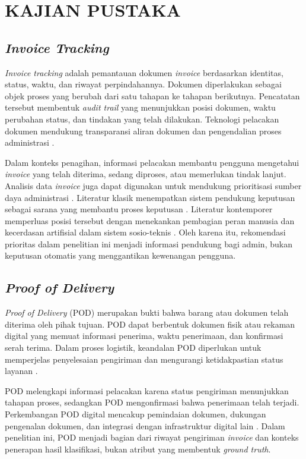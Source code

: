 \chapter{KAJIAN PUSTAKA}

\section{\textit{Invoice Tracking}}

\textit{Invoice tracking} adalah pemantauan dokumen \textit{invoice} berdasarkan identitas, status, waktu, dan riwayat perpindahannya. Dokumen diperlakukan sebagai objek proses yang berubah dari satu tahapan ke tahapan berikutnya. Pencatatan tersebut membentuk \textit{audit trail} yang menunjukkan posisi dokumen, waktu perubahan status, dan tindakan yang telah dilakukan. Teknologi pelacakan dokumen mendukung transparansi aliran dokumen dan pengendalian proses administrasi \cite{10.1007/978-3-642-55032-4_33}.

Dalam konteks penagihan, informasi pelacakan membantu pengguna mengetahui \textit{invoice} yang telah diterima, sedang diproses, atau memerlukan tindak lanjut. Analisis data \textit{invoice} juga dapat digunakan untuk mendukung prioritisasi sumber daya administrasi \cite{SchoonbeeEtAl2022}. Literatur klasik menempatkan sistem pendukung keputusan sebagai sarana yang membantu proses keputusan \cite{ShimEtAl2002}. Literatur kontemporer memperluas posisi tersebut dengan menekankan pembagian peran manusia dan kecerdasan artifisial dalam sistem sosio-teknis \cite{StoreyEtAl2024}. Oleh karena itu, rekomendasi prioritas dalam penelitian ini menjadi informasi pendukung bagi admin, bukan keputusan otomatis yang menggantikan kewenangan pengguna.

\section{\textit{Proof of Delivery}}

\textit{Proof of Delivery} (POD) merupakan bukti bahwa barang atau dokumen telah diterima oleh pihak tujuan. POD dapat berbentuk dokumen fisik atau rekaman digital yang memuat informasi penerima, waktu penerimaan, dan konfirmasi serah terima. Dalam proses logistik, keandalan POD diperlukan untuk memperjelas penyelesaian pengiriman dan mengurangi ketidakpastian status layanan \cite{gunadhya_rajawali_logistik_2021}.

POD melengkapi informasi pelacakan karena status pengiriman menunjukkan tahapan proses, sedangkan POD mengonfirmasi bahwa penerimaan telah terjadi. Perkembangan POD digital mencakup pemindaian dokumen, dukungan pengenalan dokumen, dan integrasi dengan infrastruktur digital lain \cite{LinEtAl2026POD}. Dalam penelitian ini, POD menjadi bagian dari riwayat pengiriman \textit{invoice} dan konteks penerapan hasil klasifikasi, bukan atribut yang membentuk \textit{ground truth}.

